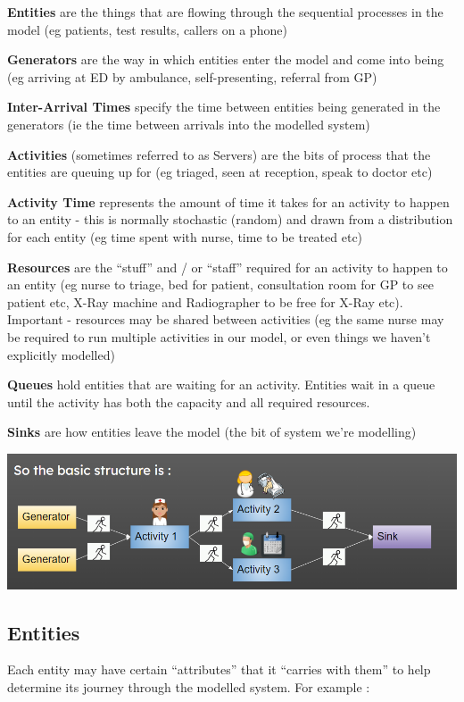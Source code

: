 \documentclass[
  letterpaper,
  DIV=11,
  numbers=noendperiod]{scrreprt}
\begin{document}
\textbf{Entities} are the things that are flowing through the sequential
processes in the model (eg patients, test results, callers on a phone)

\textbf{Generators} are the way in which entities enter the model and
come into being (eg arriving at ED by ambulance, self-presenting,
referral from GP)

\textbf{Inter-Arrival Times} specify the time between entities being
generated in the generators (ie the time between arrivals into the
modelled system)

\textbf{Activities} (sometimes referred to as Servers) are the bits of
process that the entities are queuing up for (eg triaged, seen at
reception, speak to doctor etc)

\textbf{Activity Time} represents the amount of time it takes for an
activity to happen to an entity - this is normally stochastic (random)
and drawn from a distribution for each entity (eg time spent with nurse,
time to be treated etc)

\textbf{Resources} are the ``stuff'' and / or ``staff'' required for an
activity to happen to an entity (eg nurse to triage, bed for patient,
consultation room for GP to see patient etc, X-Ray machine and
Radiographer to be free for X-Ray etc). Important - resources may be
shared between activities (eg the same nurse may be required to run
multiple activities in our model, or even things we haven't explicitly
modelled)

\textbf{Queues} hold entities that are waiting for an activity. Entities
wait in a queue until the activity has both the capacity and all
required resources.

\textbf{Sinks} are how entities leave the model (the bit of system we're
modelling)

\includegraphics{images/des_steps.png}

\subsection{Entities}\label{entities}

Each entity may have certain ``attributes'' that it ``carries with
them'' to help determine its journey through the modelled system. For
example :
\end{document}
